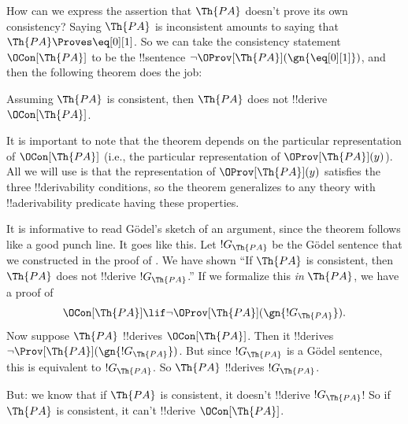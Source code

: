 \documentclass[../../../include/open-logic-section]{subfiles}
\begin{document}


How can we express the assertion that $\Th{PA}$ doesn't prove its own
consistency? Saying $\Th{PA}$ is inconsistent amounts to saying that
$\Th{PA} \Proves \eq[0][1]$. So we can take the consistency statement
$\OCon[\Th{PA}]$ to be the !!{sentence} $\lnot
\OProv[\Th{PA}](\gn{\eq[0][1]})$, and then the following theorem does
the job:

\begin{thm}
Assuming $\Th{PA}$ is consistent, then $\Th{PA}$ does not !!{derive}
$\OCon[\Th{PA}]$.
\end{thm}

It is important to note that the theorem depends on the particular
representation of $\OCon[\Th{PA}]$ (i.e., the particular
representation of $\OProv[\Th{PA}](y)$). All we will use is that the
representation of $\OProv[\Th{PA}](y)$ satisfies the three
!!{derivability} conditions, so the theorem generalizes to any theory
with !!a{derivability} predicate having these properties.

It is informative to read G\"odel's sketch of an argument, since the
theorem follows like a good punch line. It goes like this. Let
$!G_\Th{PA}$ be the G\"odel sentence that we constructed in the proof
of . We have shown ``If $\Th{PA}$
is consistent, then $\Th{PA}$ does not !!{derive} $!G_\Th{PA}$.'' If we
formalize this \emph{in} $\Th{PA}$, we have a proof of
\[
\OCon[\Th{PA}] \lif \lnot \OProv[\Th{PA}](\gn{!G_\Th{PA}}).
\]
Now suppose $\Th{PA}$ !!{derive}s $\OCon[\Th{PA}]$. Then it !!{derive}s $\lnot
\Prov[\Th{PA}](\gn{!G_\Th{PA}})$. But since $!G_\Th{PA}$ is a G\"odel
sentence, this is equivalent to $!G_\Th{PA}$. So $\Th{PA}$ !!{derive}s
$!G_\Th{PA}$.

But: we know that if $\Th{PA}$ is consistent, it doesn't !!{derive}
$!G_\Th{PA}$!{}  So if $\Th{PA}$ is consistent, it can't !!{derive}
$\OCon[\Th{PA}]$.
\end{document}
